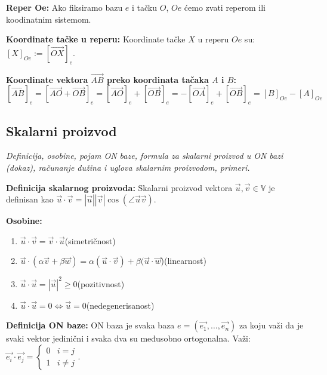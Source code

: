 \documentclass[12pt]{article}
\newcommand{\vek}[1]{\overrightarrow{#1}}
\begin{document}
\textbf{Reper Oe:} Ako fiksiramo bazu $e$ i tačku $O$, $Oe$ ćemo zvati reperom
ili koodinatnim sistemom.
\par

\textbf{Koordinate tačke u reperu:} Koordinate tačke $X$ u reperu $Oe$ su:
$[X]_{Oe}:=[\vek{OX}]_e$.
\par

\textbf{Koordinate vektora $\vek{AB}$ preko koordinata tačaka $A$ i $B$:}
$$[\vek{AB}]_e=[\vek{AO}+\vek{OB}]_e=[\vek{AO}]_e+[\vek{OB}]_e=
    -[\vek{OA}]_e+[\vek{OB}]_e=[B]_{Oe}-[A]_{Oe}$$


\subsection{Skalarni proizvod}
\textit{Definicija, osobine, pojam ON baze, formula za skalarni proizvod u ON
    bazi (dokaz), računanje dužina i uglova skalarnim proizvodom, primeri.}
\par
\vspace*{1cm}

\textbf{Definicija skalarnog proizvoda:} Skalarni proizvod vektora
$\vek{u},\vek{v}\in\mathbb{V}$ je definisan kao $\vek{u}\cdot\vek{v}=|\vek{u}|
    |\vek{v}|\cos(\angle{\vek{u}\vek{v}})$.
\par

\textbf{Osobine:}
\begin{enumerate}[label=\textit{\arabic*)}]
    \item $\vek{u}\cdot\vek{v}=\vek{v}\cdot\vek{u}$\hspace*{1cm}(simetričnost)
    \item $\vek{u}\cdot(\alpha\vek{v}+\beta\vek{w})=\alpha(\vek{u}\cdot\vek{v})
          +\beta(\vek{u}\cdot\vek{w}$)\hspace*{1cm}(linearnost)
    \item $\vek{u}\cdot\vek{u}=|\vek{u}|^2\geq0$\hspace*{1cm}(pozitivnost)
    \item $\vek{u}\cdot\vek{u}=0\iff\vek{u}=0$\hspace*{1cm}(nedegenerisanost)
\end{enumerate}
\par

\textbf{Definicija ON baze:} ON baza je svaka baza $e=(\vek{e_1},\dotsc,
    \vek{e_n})$ za koju važi da je svaki vektor jedinični i svaka dva su
međusobno ortogonalna. Važi: $\vek{e_i}\cdot\vek{e_j} =
    \begin{cases}
        0 & i=j     \\
        1 & i\neq j
    \end{cases}$.
\par
\end{document}
